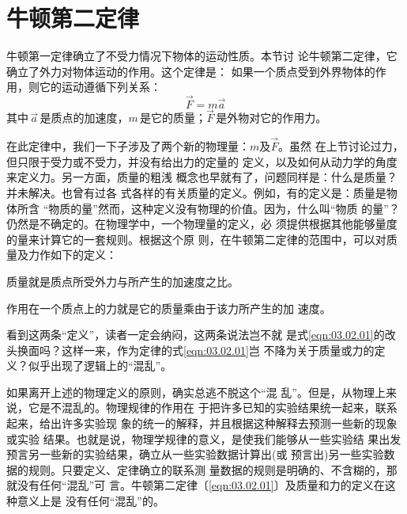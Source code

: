\section{牛顿第二定律}\label{sec:03.02}

{牛顿第一定律确立了不受力情况下物体的运动性质。本节讨
论牛顿第二定律，它确立了外力对物体运动的作用。这个定律是：
如果一个质点受到外界物体的作用，则它的运动遵循下列关系：}
\begin{equation}\label{eqn:03.02.01}
    \vec{F} = m \vec{a}
\end{equation}
其中\,$\vec{a}$\,是质点的加速度，$m$\,是它的质量；$\vec{F}$\,是外物对它的作用力。

{在此定律中，我们一下子涉及了两个新的物理量：$m$及$\vec{F}$。虽然
在上节讨论过力，但只限于受力或不受力，并没有给出力的定量的
定义，以及如何从动力学的角度来定义力。另一方面，质量的粗浅
概念也早就有了，问题同样是：什么是质量？并未解决。也曾有过各
式各样的有关质量的定义。例如，有的定义是：质量是物体所含
“物质的量”然而，这种定义没有物理的价值。因为，什么叫“物质
的量”？仍然是不确定的。在物理学中，一个物理量的定义，必
须提供根据其他能够量度的量来计算它的一套规则。根据这个原
则，在牛顿第二定律的范围中，可以对质量及力作如下的定义：}

质量就是质点所受外力与所产生的加速度之比。

作用在一个质点上的力就是它的质量乘由于该力所产生的加
速度。

看到这两条“定义”，读者一定会纳闷，这两条说法岂不就
是式\eqref{eqn:03.02.01}的改头换面吗？这样一来，作为定律的式\eqref{eqn:03.02.01}岂
不降为关于质量或力的定义？似乎出现了逻辑上的“混乱”。

如果离开上述的物理定义的原则，确实总逃不脱这个“混
乱”。但是，从物理上来说，它是不混乱的。物理规律的作用在
于把许多已知的实验结果统一起来，联系起来，给出许多实验现
象的统一的解释，并且根据这种解释去预测一些新的现象或实验
结果。也就是说，物理学规律的意义，是使我们能够从一些实验结
果出发预言另一些新的实验结果，确立从一些实验数据计算出(或
预言出)另一些实验数据的规则。只要定义、定律确立的联系测
量数据的规则是明确的、不含糊的，那就没有任何“混乱”可
言。牛顿第二定律〔\eqref{eqn:03.02.01}〕及质量和力的定义在这种意义上是
没有任何“混乱”的。

